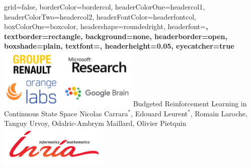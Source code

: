 \documentclass[paperwidth=36in,paperheight=48in,portrait,fontscale=0.355, margin=2cm]{baposter}
\begin{document}
\begin{poster}{
grid=false,
borderColor=bordercol, %
headerColorOne=headercol1, %
headerColorTwo=headercol2, %
headerFontColor=headerfontcol, %
boxColorOne=boxcolor, %
headershape=roundedright, %
headerfont=\Large\bf\textsc, %
textborder=rectangle,
background=none,
headerborder=open, %
boxshade=plain,
textfont={\setlength{\parindent}{0.0em}\sffamily},
headerheight={0.05\textheight},
eyecatcher=true
}
%
%
{
\includegraphics[width=18em]{./img/companies}
}
{
Budgeted Reinforcement Learning in Continuous State Space
}
{
Nicolas Carrara$^*$, Edouard Leurent$^*$, Romain Laroche, \\Tanguy Urvoy, Odalric-Ambrym Maillard, Olivier Pietquin
\vspace{-3\baselineskip}
}
{
\includegraphics[width=14em]{./img/inria_sc}
}

\setlength{\colheight}{0.92\textheight}



\end{poster}
\end{document}
